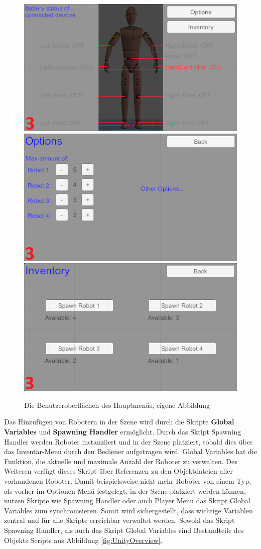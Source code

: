 \begin{figure}[h]
	\centering
	\includegraphics[width=0.45\linewidth]{Bilder/A49_MM1_2}
	\includegraphics[width=0.45\linewidth]{Bilder/A50_MM2_2}
	\includegraphics[width=0.45\linewidth]{Bilder/A51_MM3_2}
	\caption{Die Benutzeroberflächen des Hauptmenüs, eigene Abbildung}
	\label{fig:MainMenu}
\end{figure}
\newline
Das Hinzufügen von Robotern in der Szene wird durch die Skripte \textbf{Global Variables} und \textbf{Spawning Handler} ermöglicht. Durch das Skript Spawning Handler werden Roboter instanziiert und in der Szene platziert, sobald dies über das Inventar-Menü durch den Bediener aufgetragen wird. Global Variables hat die Funktion, die aktuelle und maximale Anzahl der Roboter zu verwalten. Des Weiteren verfügt dieses Skript über Referenzen zu den Objektdateien aller vorhandenen Roboter. Damit beispielsweise nicht mehr Roboter von einem Typ, als vorher im Optionen-Menü festgelegt, in der Szene platziert werden können, nutzen Skripte wie Spawning Handler oder auch Player Menu das Skript Global Variables zum synchronisieren. Somit wird sichergestellt, dass wichtige Variablen zentral und für alle Skripte erreichbar verwaltet werden. Sowohl das Skript Spawning Handler, als auch das Skript Global Variables sind Bestandteile des Objekts Scripts aus Abbildung \ref{fig:UnityOverview}.
\newline\newline

